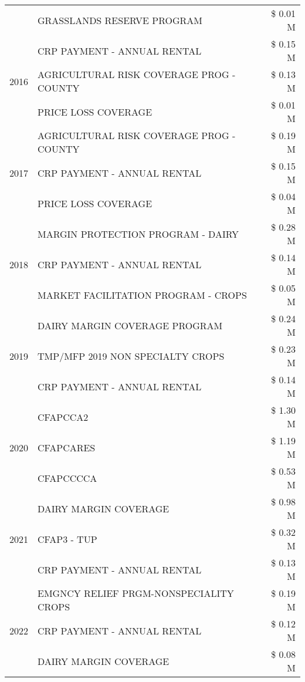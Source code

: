 \begin{tabular}{llr}
 & GRASSLANDS RESERVE PROGRAM & \$ 0.01 M \\
\cline{1-3}
\multirow[t]{3}{*}{2016} & CRP PAYMENT - ANNUAL RENTAL & \$ 0.15 M \\
 & AGRICULTURAL RISK COVERAGE PROG - COUNTY & \$ 0.13 M \\
 & PRICE LOSS COVERAGE & \$ 0.01 M \\
\cline{1-3}
\multirow[t]{3}{*}{2017} & AGRICULTURAL RISK COVERAGE PROG - COUNTY & \$ 0.19 M \\
 & CRP PAYMENT - ANNUAL RENTAL & \$ 0.15 M \\
 & PRICE LOSS COVERAGE & \$ 0.04 M \\
\cline{1-3}
\multirow[t]{3}{*}{2018} & MARGIN PROTECTION PROGRAM - DAIRY & \$ 0.28 M \\
 & CRP PAYMENT - ANNUAL RENTAL & \$ 0.14 M \\
 & MARKET FACILITATION PROGRAM - CROPS & \$ 0.05 M \\
\cline{1-3}
\multirow[t]{3}{*}{2019} & DAIRY MARGIN COVERAGE PROGRAM & \$ 0.24 M \\
 & TMP/MFP 2019 NON SPECIALTY CROPS & \$ 0.23 M \\
 & CRP PAYMENT - ANNUAL RENTAL & \$ 0.14 M \\
\cline{1-3}
\multirow[t]{3}{*}{2020} & CFAPCCA2 & \$ 1.30 M \\
 & CFAPCARES & \$ 1.19 M \\
 & CFAPCCCCA & \$ 0.53 M \\
\cline{1-3}
\multirow[t]{3}{*}{2021} & DAIRY MARGIN COVERAGE & \$ 0.98 M \\
 & CFAP3 - TUP & \$ 0.32 M \\
 & CRP PAYMENT - ANNUAL RENTAL & \$ 0.13 M \\
\cline{1-3}
\multirow[t]{3}{*}{2022} & EMGNCY RELIEF PRGM-NONSPECIALITY CROPS & \$ 0.19 M \\
 & CRP PAYMENT - ANNUAL RENTAL & \$ 0.12 M \\
 & DAIRY MARGIN COVERAGE & \$ 0.08 M \\
\cline{1-3}
\bottomrule
\end{tabular}
